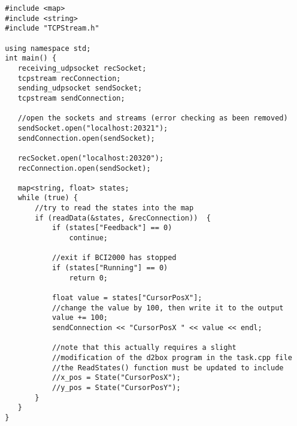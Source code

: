 \begin{verbatim}
 #include <map>
 #include <string>
 #include "TCPStream.h"

 using namespace std;
 int main() {
    receiving_udpsocket recSocket;
    tcpstream recConnection;
    sending_udpsocket sendSocket;
    tcpstream sendConnection;

    //open the sockets and streams (error checking as been removed)
    sendSocket.open("localhost:20321");
    sendConnection.open(sendSocket);

    recSocket.open("localhost:20320");
    recConnection.open(sendSocket);

    map<string, float> states;
    while (true) {
        //try to read the states into the map
        if (readData(&states, &recConnection))  {
            if (states["Feedback"] == 0)
                continue;

            //exit if BCI2000 has stopped
            if (states["Running"] == 0)
                return 0;

            float value = states["CursorPosX"];
            //change the value by 100, then write it to the output
            value += 100;
            sendConnection << "CursorPosX " << value << endl;

            //note that this actually requires a slight 
            //modification of the d2box program in the task.cpp file
            //the ReadStates() function must be updated to include 
            //x_pos = State("CursorPosX");
            //y_pos = State("CursorPosY"); 
        }
    }
 }
\end{verbatim}